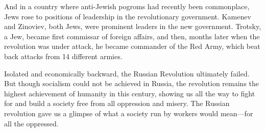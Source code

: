 And in a country where anti-Jewish pogroms had recently been commonplace, Jews rose to positions of leadership in the revolutionary government. Kamenev and Zinoviev, both Jews, were prominent leaders in the new government. Trotsky, a Jew, became first commissar of foreign affairs, and then, months later when the revolution was under attack, he became commander of the Red Army, which beat back attacks from 14 different armies.

Isolated and economically backward, the Russian Revolution ultimately failed. But though socialism could not be achieved in Russia, the revolution remains the highest achievement of humanity in this century, showing us all the way to fight for and build a society free from all oppression and misery. The Russian revolution gave us a glimpse of what a society run by workers would mean---for all the oppressed.
